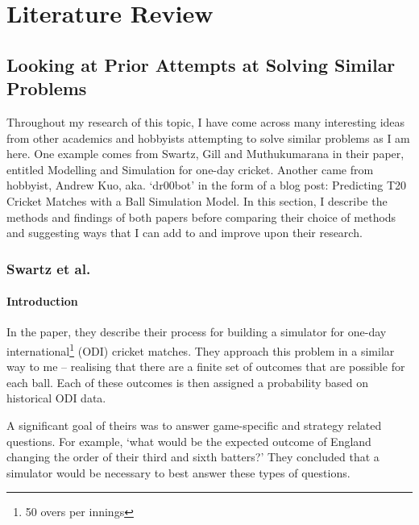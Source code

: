 \titleformat{\chapter}[hang]{\Huge\bfseries}{\thechapter\hsp\textcolor{gray75}{|}\hsp}{0pt}{\Huge\bfseries}
\chapter{Literature Review}

\section{Looking at Prior Attempts at Solving Similar Problems}

Throughout my research of this topic, I have come across many interesting ideas from other academics and hobbyists attempting to solve similar problems as I am here. One example comes from Swartz, Gill and Muthukumarana \cite{swartz_modelling_2009} in their paper, entitled Modelling and Simulation for one-day cricket. Another came from hobbyist, Andrew Kuo, aka. ‘dr00bot’ \cite{kuo_predicting_2021} in the form of a blog post: Predicting T20 Cricket Matches with a Ball Simulation Model. In this section, I describe the methods and findings of both papers before comparing their choice of methods and suggesting ways that I can add to and improve upon their research.

\subsection{Swartz et al.}

\subsubsection{Introduction}

In the paper, they describe their process for building a simulator for one-day international\footnote{50 overs per innings} (ODI) cricket matches. They approach this problem in a similar way to me – realising that there are a finite set of outcomes that are possible for each ball. Each of these outcomes is then assigned a probability based on historical ODI data.

A significant goal of theirs was to answer game-specific and strategy related questions. For example, ‘what would be the expected outcome of England changing the order of their third and sixth batters?’ They concluded that a simulator would be necessary to best answer these types of questions.

